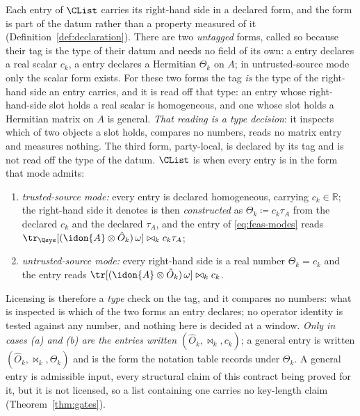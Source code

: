 \begin{definition}\label{def:homog}
Each entry of $\CList$ carries its right-hand side in a declared form, and
the form is part of the datum rather than a property measured of it
(Definition~\ref{def:declaration}). There are two \emph{untagged} forms,
called so because their tag is the type of their datum and needs no field of
its own: a
entry declares a real scalar $c_k$, a
entry declares a Hermitian $\Theta_k$ on $A$; in untrusted-source mode only
the scalar form exists. For these two forms
the tag \emph{is} the type of the right-hand side an entry carries, and it is
read off that type: an entry whose right-hand-side slot holds a real scalar
is homogeneous, and one whose slot holds a Hermitian matrix on $A$ is
general. \emph{That
reading is a type decision}: it inspects which of two objects a slot holds,
compares no numbers, reads no matrix entry and measures nothing. The third
form, party-local, is declared by its tag and is not read off the type of the
datum. $\CList$ is
when every entry is in the form that mode admits:
\begin{enumerate}[label=(\alph*),leftmargin=2.2em]
\item \emph{trusted-source mode:} every entry is declared
  homogeneous, carrying $c_k\in\mathbb{R}$; the right-hand side it denotes is
  then \emph{constructed} as $\Theta_k\coloneqq c_k\tau_A$ from the declared
  $c_k$ and the declared $\tau_A$, and the entry of \eqref{eq:feas-modes}
  reads $\tr_{\Qsys}[(\idon{A}\otimes\hat O_k)\,\omega]\bowtie_kc_k\tau_A$;
\item \emph{untrusted-source mode:} every right-hand side is a real number
  $\Theta_k=c_k$ and the entry reads
  $\tr[(\idon{A}\otimes\hat O_k)\,\omega]\bowtie_kc_k$.
\end{enumerate}
Licensing is therefore a \emph{type} check on the tag, and it compares no
numbers: what is inspected is which of the two forms an entry declares; no
operator identity is tested against any number, and nothing here is decided
at a window. \emph{Only in cases (a) and
(b) are the entries written $(\hat O_k,\bowtie_k,c_k)$}; a
general entry is written $(\hat O_k,\bowtie_k,\Theta_k)$ and is the form the
notation table records under $\Theta_k$. A general entry is admissible
input, every structural claim of this contract being proved for it, but it is
not licensed, so a list containing one carries no key-length claim
(Theorem~\ref{thm:gates}).


\end{definition}
